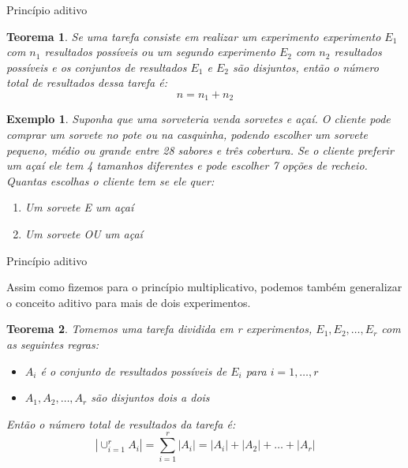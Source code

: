\documentclass{beamer}
\newtheorem{teorema}{Teorema}
\newtheorem{exemplo}{Exemplo}
\begin{document}
\begin{frame}{Princípio aditivo}

\begin{teorema}
    Se uma tarefa consiste em realizar um experimento experimento $E_1$ com $n_1$ resultados possíveis ou um segundo experimento $E_2$ com $n_2$ resultados possíveis e os conjuntos de resultados $E_1$ e $E_2$ são disjuntos, então o número total de resultados dessa tarefa é:
    $$n = n_1 + n_2$$
\end{teorema}
    \begin{exemplo}
        Suponha que uma sorveteria venda sorvetes e açaí. O cliente pode comprar um sorvete no pote ou na casquinha, podendo escolher um sorvete pequeno, médio ou grande entre 28 sabores e três cobertura. Se o cliente preferir um açaí ele tem 4 tamanhos diferentes e pode escolher 7 opções de recheio. Quantas escolhas o cliente tem se ele quer:
        \begin{enumerate}
            \item Um sorvete E um açaí
            \item Um sorvete OU um açaí
        \end{enumerate}
    \end{exemplo}
\end{frame}

\begin{frame}{Princípio aditivo}

Assim como fizemos para o princípio multiplicativo, podemos também generalizar o conceito aditivo para mais de dois experimentos.

\begin{teorema}
    Tomemos uma tarefa dividida em r experimentos, $E_1, E_2, \dots, E_r$ com as seguintes regras:
    \begin{itemize}
        \item $A_i$ é o conjunto de resultados possíveis de $E_i$ para $i=1, \dots, r$
        \item$ A_1, A_2, \dots, A_r$ são disjuntos dois a dois
    \end{itemize}

    Então o número total de resultados da tarefa é:
    $$\left| \cup_{i=1}^r A_i\right| = \sum_{i=1}^{r} |A_i| = |A_i| + |A_2| + \dots + |A_r|$$
    
\end{teorema}

    
\end{frame}
\end{document}
